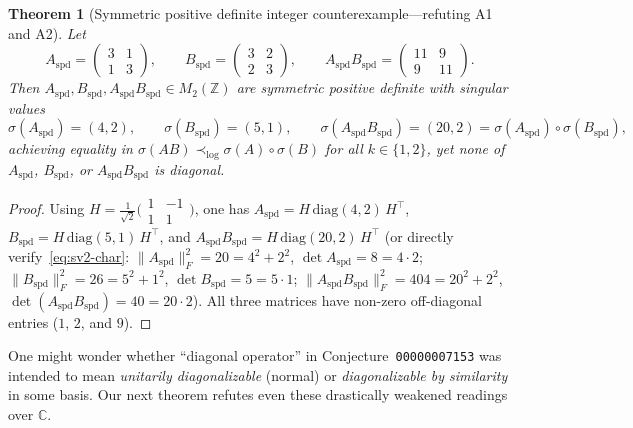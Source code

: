 \documentclass[11pt,a4paper]{article}
\newtheorem{theorem}{Theorem}[section]
\theoremstyle{definition}
\newcommand{\C}{\mathbb{C}}
\newcommand{\Z}{\mathbb{Z}}
\newcommand{\diag}{\mathrm{diag}}
\begin{document}
\begin{theorem}[Symmetric positive definite integer counterexample---refuting A1 and A2]\label{thm:spd-cex}
Let
\[
  A_{\mathrm{spd}} = \begin{pmatrix} 3 & 1 \\ 1 & 3 \end{pmatrix},
  \qquad
  B_{\mathrm{spd}} = \begin{pmatrix} 3 & 2 \\ 2 & 3 \end{pmatrix},
  \qquad
  A_{\mathrm{spd}} B_{\mathrm{spd}} = \begin{pmatrix} 11 & 9 \\ 9 & 11 \end{pmatrix}.
\]
Then $A_{\mathrm{spd}}, B_{\mathrm{spd}}, A_{\mathrm{spd}}B_{\mathrm{spd}} \in M_2(\Z)$ are symmetric positive definite with singular values
\[
  \sigma(A_{\mathrm{spd}}) = (4, 2), \qquad
  \sigma(B_{\mathrm{spd}}) = (5, 1), \qquad
  \sigma(A_{\mathrm{spd}}B_{\mathrm{spd}}) = (20, 2) = \sigma(A_{\mathrm{spd}})\circ\sigma(B_{\mathrm{spd}}),
\]
achieving equality in $\sigma(AB) \prec_{\log} \sigma(A)\circ\sigma(B)$ for all $k \in \{1, 2\}$, yet none of $A_{\mathrm{spd}}$, $B_{\mathrm{spd}}$, or $A_{\mathrm{spd}}B_{\mathrm{spd}}$ is diagonal.
\end{theorem}

\begin{proof}
Using $H = \frac{1}{\sqrt{2}}\bigl(\begin{smallmatrix} 1 & -1 \\ 1 & 1 \end{smallmatrix}\bigr)$, one has $A_{\mathrm{spd}} = H\,\diag(4,2)\,H^\top$, $B_{\mathrm{spd}} = H\,\diag(5,1)\,H^\top$, and $A_{\mathrm{spd}}B_{\mathrm{spd}} = H\,\diag(20,2)\,H^\top$ (or directly verify~\eqref{eq:sv2-char}: $\|A_{\mathrm{spd}}\|_F^2 = 20 = 4^2+2^2$, $\det A_{\mathrm{spd}} = 8 = 4\cdot 2$; $\|B_{\mathrm{spd}}\|_F^2 = 26 = 5^2+1^2$, $\det B_{\mathrm{spd}} = 5 = 5\cdot 1$; $\|A_{\mathrm{spd}}B_{\mathrm{spd}}\|_F^2 = 404 = 20^2+2^2$, $\det(A_{\mathrm{spd}}B_{\mathrm{spd}}) = 40 = 20\cdot 2$). All three matrices have non-zero off-diagonal entries ($1$, $2$, and $9$).
\end{proof}

One might wonder whether ``diagonal operator'' in Conjecture~\texttt{00000007153} was intended to mean \emph{unitarily diagonalizable} (normal) or \emph{diagonalizable by similarity} in some basis. Our next theorem refutes even these drastically weakened readings over $\C$.
\end{document}
